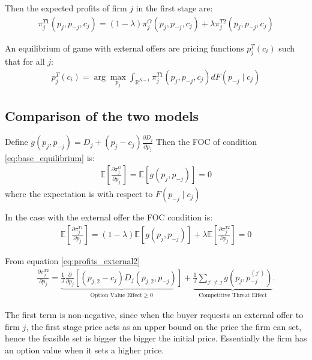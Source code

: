 \documentclass[12pt]{article}
\begin{document}
Then the expected profits of firm $j$ in the first stage are: 
\begin{align}
    \pi_j^{T1}(p_j, p_{-j}, c_j) = (1-\lambda) \pi_j^O(p_j, p_{-j}, c_j) + \lambda \pi_j^{T2}(p_j, p_{-j}, c_j)
\end{align}

An equilibrium of game with external offers are pricing functions  $p_j^T(c_i)$ such that for all $j$:
\begin{align}\label{eq:base_equilibrium3}
    p_j^T(c_i) = \arg \max_{p_j} \int_{\mathbb{R}^{N-1}}^{}  \pi_j^{T1}(p_j, p_{-j}, c_j) dF(p_{-j} \mid c_j)   
\end{align}



\subsection{Comparison of the two models }

Define $g(p_j, p_{-j}) =  D_j + (p_j - c_j) \frac{\partial D_j}{\partial p_j}$ 
Then the FOC of condition \ref{eq:base_equilibrium} is:
\begin{align}
\label{eq:FOC_base} 
    \mathbb{E}\left[ \frac{\partial \pi_j^{O}}{\partial p_j} \right] = \mathbb{E}\left[ g(p_j, p_{-j}) \right] = 0
\end{align}
where the expectation is with respect to $F(p_{-j} \mid c_j)$

In the case with the external offer the FOC condition is: 
\begin{align}
\label{eq:FOC_external} 
    \mathbb{E}\left[ \frac{\partial \pi_j^{T1}}{\partial p_j} \right] = (1-\lambda) \mathbb{E}\left[ g(p_j, p_{-j}) \right] + \lambda \mathbb{E}\left[ \frac{\partial \pi_j^{T2}}{\partial p_j} \right] = 0   
\end{align}





From equation  \ref{eq:profits_external2}
\begin{align}
    \frac{\partial \pi_j^{T2}}{\partial p_j} = \underbrace{\frac{1}{J} \frac{\partial}{\partial p_j} \left[ (p_{j,2} - c_j) D_j(p_{j,2}, p_{-j}) \right]}_{\text{Option Value Effect} \geq 0 } + \underbrace{\frac{1}{J} \sum_{j' \ne j} g(p_j, p_{-j}^{(j')})}_{\text{Competitive Threat Effect}}.
\end{align}

The first term is non-negative, since when the buyer requests an external offer to firm $j$, the first stage price acts as an upper bound on the price the firm can set, hence the feasible set is bigger the bigger the initial price.  Essentially the firm has an option value when it sets a higher price. 
\end{document}
